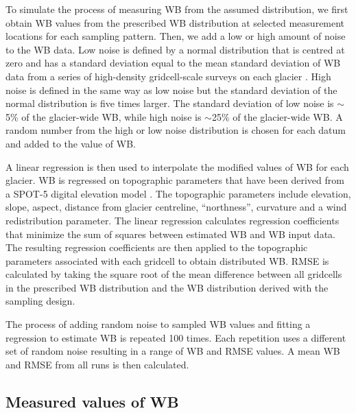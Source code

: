 \documentclass[twocolumn,letterpaper]{igs}
\begin{document}
To simulate the process of measuring WB from the assumed distribution, we first obtain WB values from the prescribed WB distribution at selected measurement locations for each sampling pattern. Then, we add a low or high amount of noise to the WB data. Low noise is defined by a normal distribution that is centred at zero and has a standard deviation equal to the mean standard deviation of WB data from a series of high-density gridcell-scale surveys on each glacier \citep[see][for details]{Pulwicki2017}. High noise is defined in the same way as low noise but the standard deviation of the normal distribution is five times larger. The standard deviation of low noise is $\sim$5\% of the glacier-wide WB, while high noise is $\sim$25\% of the glacier-wide WB. A random number from the high or low noise distribution is chosen for each datum and added to the value of WB. 

A linear regression is then used to interpolate the modified values of WB for each glacier. WB is regressed on topographic parameters that have been derived from a SPOT-5 digital elevation model \citep[see][for details]{Pulwicki2017}. The topographic parameters include elevation, slope, aspect, distance from glacier centreline, ``northness'', curvature and a wind redistribution parameter. The linear regression calculates regression coefficients that minimize the sum of squares between estimated WB and WB input data. The resulting regression coefficients are then applied to the topographic parameters associated with each gridcell to obtain distributed WB. RMSE is calculated by taking the square root of the mean difference between all gridcells in the prescribed WB distribution and the WB distribution derived with the sampling design.

The process of adding random noise to sampled WB values and fitting a regression to estimate WB is repeated 100 times. Each repetition uses a different set of random noise resulting in a range of WB and RMSE values. A mean WB and RMSE from all runs is then calculated. 

\subsection{Measured values of WB}
\end{document}

